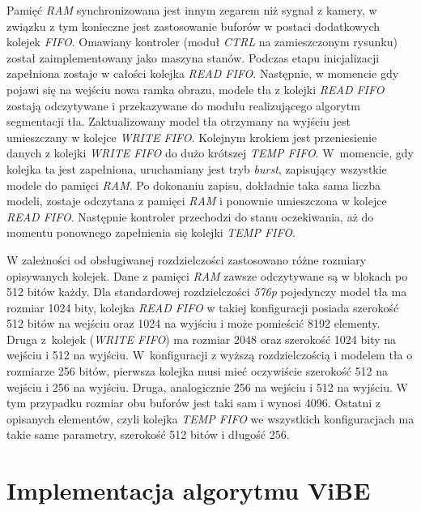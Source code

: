 Pamięć \textit{RAM} synchronizowana jest innym zegarem niż sygnał z kamery, w związku z tym konieczne jest zastosowanie buforów w postaci dodatkowych kolejek \textit{FIFO}. 
Omawiany kontroler (moduł \textit{CTRL} na zamieszczonym rysunku) został zaimplementowany jako maszyna stanów.
Podczas etapu inicjalizacji zapełniona zostaje w całości kolejka \textit{READ FIFO}. 
Następnie, w momencie gdy pojawi się na wejściu nowa ramka obrazu, modele tła z kolejki \textit{READ FIFO} zostają odczytywane i przekazywane do modułu realizującego algorytm segmentacji tła. 
Zaktualizowany model tła otrzymany na wyjściu jest umieszczany w kolejce \textit{WRITE FIFO}. 
Kolejnym krokiem jest przeniesienie danych z kolejki \textit{WRITE FIFO} do dużo krótszej \textit{TEMP FIFO}. 
W~momencie, gdy kolejka ta jest zapełniona, uruchamiany jest tryb \textit{burst}, zapisujący wszystkie modele do pamięci \textit{RAM}. 
Po dokonaniu zapisu, dokładnie taka sama liczba modeli, zostaje odczytana z pamięci \textit{RAM} i ponownie umieszczona w kolejce \textit{READ FIFO}. 
Następnie kontroler przechodzi do stanu oczekiwania, aż do momentu ponownego zapełnienia się kolejki \textit{TEMP FIFO}. 

W zależności od obsługiwanej rozdzielczości zastosowano różne rozmiary opisywanych kolejek. 
Dane z pamięci \textit{RAM} zawsze odczytywane są w blokach po \num{512} bitów każdy. 
Dla standardowej rozdzielczości \textit{576p} pojedynczy model tła ma rozmiar \num{1024} bity, kolejka \textit{READ FIFO} w takiej konfiguracji posiada szerokość \num{512} bitów na wejściu oraz \num{1024} na wyjściu i może pomieścić \num{8192} elementy. 
Druga z~kolejek (\textit{WRITE FIFO}) ma rozmiar \num{2048} oraz szerokość \num{1024} bity na wejściu i \num{512} na wyjściu.
W~konfiguracji z wyższą rozdzielczością i modelem tła o rozmiarze \num{256} bitów, pierwsza kolejka musi mieć oczywiście szerokość \num{512} na wejściu i \num{256} na wyjściu. 
Druga, analogicznie \num{256} na wejściu i \num{512} na wyjściu. 
W tym przypadku rozmiar obu buforów jest taki sam i wynosi \num{4096}. 
Ostatni z opisanych elementów, czyli kolejka \textit{TEMP FIFO} we wszystkich konfiguracjach ma takie same parametry, szerokość \num{512} bitów i długość \num{256}.




\section{Implementacja algorytmu ViBE}
\label{sec:fpga_vibe}

